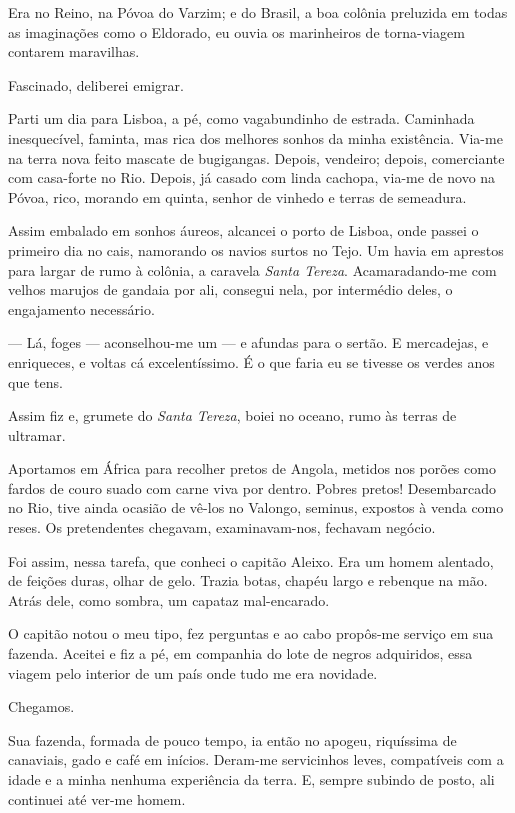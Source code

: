 Era no Reino, na Póvoa do Varzim; e do Brasil, a boa colônia preluzida
em todas as imaginações como o Eldorado, eu ouvia os marinheiros de
torna-viagem contarem maravilhas.

Fascinado, deliberei emigrar.

Parti um dia para Lisboa, a pé, como vagabundinho de estrada. Caminhada
inesquecível, faminta, mas rica dos melhores sonhos da minha existência.
Via-me na terra nova feito mascate de bugigangas. Depois, vendeiro;
depois, comerciante com casa-forte no Rio. Depois, já casado com linda
cachopa, via-me de novo na Póvoa, rico, morando em quinta, senhor de
vinhedo e terras de semeadura.

Assim embalado em sonhos áureos, alcancei o porto de Lisboa, onde passei
o primeiro dia no cais, namorando os navios surtos no Tejo. Um havia em
aprestos para largar de rumo à colônia, a caravela \emph{Santa Tereza}.
Acamaradando-me com velhos marujos de gandaia por ali, consegui nela,
por intermédio deles, o engajamento necessário.

--- Lá, foges --- aconselhou-me um --- e afundas para o sertão. E
mercadejas, e enriqueces, e voltas cá excelentíssimo. É o que faria eu
se tivesse os verdes anos que tens.

Assim fiz e, grumete do \emph{Santa Tereza}, boiei no oceano, rumo às
terras de ultramar.

Aportamos em África para recolher pretos de Angola, metidos nos porões
como fardos de couro suado com carne viva por dentro. Pobres pretos!
Desembarcado no Rio, tive ainda ocasião de vê-los no Valongo, seminus,
expostos à venda como reses. Os pretendentes chegavam, examinavam-nos,
fechavam negócio.

Foi assim, nessa tarefa, que conheci o capitão Aleixo. Era um homem
alentado, de feições duras, olhar de gelo. Trazia botas, chapéu largo e
rebenque na mão. Atrás dele, como sombra, um capataz mal-encarado.

O capitão notou o meu tipo, fez perguntas e ao cabo propôs-me serviço em
sua fazenda. Aceitei e fiz a pé, em companhia do lote de negros
adquiridos, essa viagem pelo interior de um país onde tudo me era
novidade.

Chegamos.

Sua fazenda, formada de pouco tempo, ia então no apogeu, riquíssima de
canaviais, gado e café em inícios. Deram-me servicinhos leves,
compatíveis com a idade e a minha nenhuma experiência da terra. E,
sempre subindo de posto, ali continuei até ver-me homem.

